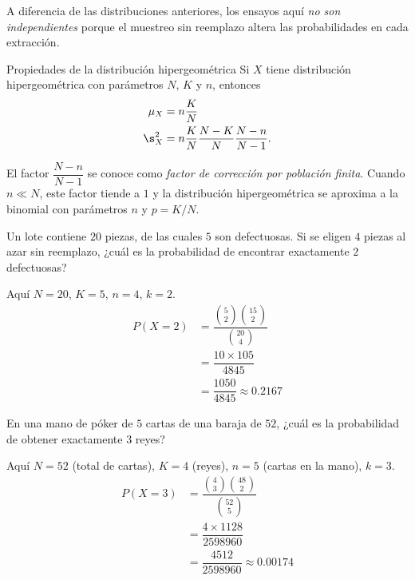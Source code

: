 A diferencia de las distribuciones anteriores, los ensayos aquí \emph{no son independientes} porque el muestreo sin reemplazo altera las probabilidades en cada extracción.

{Propiedades de la distribución hipergeométrica} Si $X$ tiene distribución hipergeométrica con parámetros $N$, $K$ y $n$, entonces
\begin{align}
 \mu_{X} &= n\dfrac{K}{N} \\
 \s_{X}^{2} &= n\dfrac{K}{N}\dfrac{N-K}{N}\dfrac{N-n}{N-1}.
\end{align}

El factor $\dfrac{N-n}{N-1}$ se conoce como \emph{factor de corrección por población finita}. Cuando $n \ll N$, este factor tiende a $1$ y la distribución hipergeométrica se aproxima a la binomial con parámetros $n$ y $p=K/N$.

\begin{ejemplo}
 \label{exmp:2.10.16}
 Un lote contiene $20$ piezas, de las cuales $5$ son defectuosas. Si se eligen $4$ piezas al azar sin reemplazo, ¿cuál es la probabilidad de encontrar exactamente $2$ defectuosas?
\end{ejemplo}

\begin{solucion}
	Aquí $N=20$, $K=5$, $n=4$, $k=2$.
	\begin{align}
		P(X=2) &= \dfrac{\binom{5}{2}\binom{15}{2}}{\binom{20}{4}} \\
		&= \dfrac{10 \times 105}{4845} \\
		&= \dfrac{1050}{4845} \approx 0.2167
	\end{align}
\end{solucion}

\begin{ejemplo}
 \label{exmp:2.10.17}
 En una mano de póker de $5$ cartas de una baraja de $52$, ¿cuál es la probabilidad de obtener exactamente $3$ reyes?
\end{ejemplo}

\begin{solucion}
	Aquí $N=52$ (total de cartas), $K=4$ (reyes), $n=5$ (cartas en la mano), $k=3$.
	\begin{align}
		P(X=3) &= \dfrac{\binom{4}{3}\binom{48}{2}}{\binom{52}{5}} \\
		&= \dfrac{4 \times 1128}{2598960} \\
		&= \dfrac{4512}{2598960} \approx 0.00174
	\end{align}
\end{solucion}


